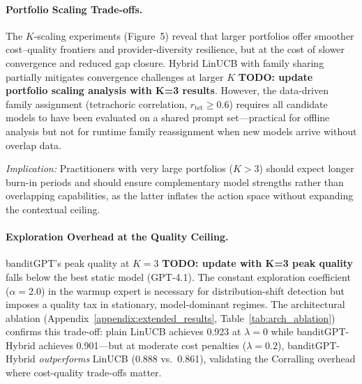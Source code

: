 \paragraph{Portfolio Scaling Trade-offs.}
The $K$-scaling experiments (Figure~5) reveal that larger portfolios offer
smoother cost--quality frontiers and provider-diversity resilience, but at the
cost of slower convergence and reduced gap closure.
Hybrid LinUCB with family sharing partially mitigates convergence challenges at larger $K$
\textbf{TODO: update portfolio scaling analysis with K=3 results}.
However, the data-driven family assignment (tetrachoric correlation,
$r_{\text{tet}} \geq 0.6$) requires all candidate models to have been
evaluated on a shared prompt set---practical for offline analysis but not for
runtime family reassignment when new models arrive without overlap data.

\emph{Implication:}
Practitioners with very large portfolios ($K > 3$) should expect longer
burn-in periods and should ensure complementary model strengths rather than
overlapping capabilities, as the latter inflates the action space without
expanding the contextual ceiling.

\paragraph{Exploration Overhead at the Quality Ceiling.}
banditGPT's peak quality at $K{=}3$ \textbf{TODO: update with K=3 peak quality} falls
below the best static model (GPT-4.1).
The constant exploration coefficient ($\alpha{=}2.0$) in the warmup expert is
necessary for distribution-shift detection but imposes a quality tax in
stationary, model-dominant regimes.
The architectural ablation
(Appendix~\ref{appendix:extended_results}, Table~\ref{tab:arch_ablation})
confirms this trade-off: plain LinUCB achieves 0.923 at $\lambda{=}0$ while
banditGPT-Hybrid achieves 0.901---but at moderate cost penalties
($\lambda{=}0.2$), banditGPT-Hybrid \emph{outperforms} LinUCB
(0.888 vs.\ 0.861), validating the Corralling overhead where cost-quality
trade-offs matter.

